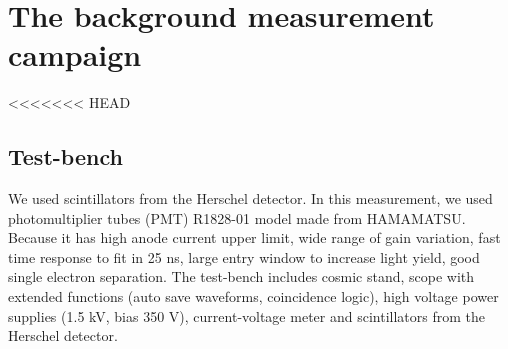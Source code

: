 \section{The background measurement campaign}
\label{sec:Measurement}


<<<<<<< HEAD
\subsection{Test-bench}
We used scintillators from the Herschel detector.
In this measurement, we used photomultiplier tubes (PMT) R1828-01 model made from HAMAMATSU.
Because it has high anode current upper limit, wide range of gain variation, fast time response to fit in 25 ns, large entry window to increase light yield, good single electron separation.
The test-bench includes cosmic stand, scope with extended functions (auto save waveforms, coincidence logic), high voltage power supplies (1.5 kV, bias 350 V), current-voltage meter and scintillators from the Herschel detector.

